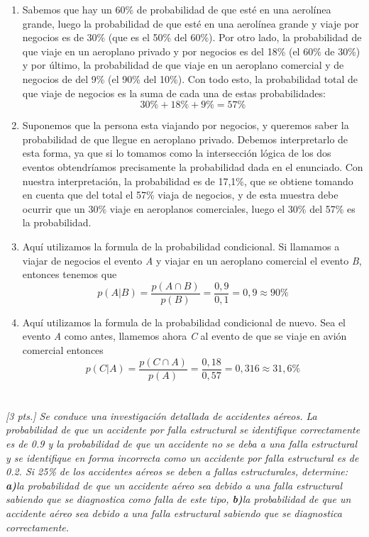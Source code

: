 \documentclass[11pt]{article}
\renewcommand{\(}{\left(}
\renewcommand{\)}{\right)}
\begin{document}
\begin{enumerate}
	\item Sabemos que hay un 60\% de probabilidad de que esté en una aerolínea grande, luego la probabilidad de que esté en una aerolínea grande y viaje por negocios es de 30\% (que es el 50\% del 60\%). Por otro lado, la probabilidad de que viaje en un aeroplano privado y por negocios es del 18\% (el 60\% de 30\%) y por último, la probabilidad de que viaje en un aeroplano comercial y de negocios de del 9\% (el 90\% del 10\%). Con todo esto, la probabilidad total de que viaje de negocios es la suma de cada una de estas probabilidades: $$ 30\%+18\%+9\% = 57\%$$
	\item Suponemos que la persona esta viajando por negocios, y queremos saber la probabilidad de que llegue en aeroplano privado. Debemos interpretarlo de esta forma, ya que si lo tomamos como la intersección lógica de los dos eventos obtendríamos precisamente la probabilidad dada en el enunciado. Con nuestra interpretación, la probabilidad es de 17,1\%, que se obtiene tomando en cuenta que del total el 57\% viaja de negocios, y de esta muestra debe ocurrir que un 30\% viaje en aeroplanos comerciales, luego el 30\% del 57\% es la probabilidad.
	\item Aquí utilizamos la formula de la probabilidad condicional. Si llamamos a viajar de negocios el evento \textit{A} y viajar en un aeroplano comercial el evento \textit{B}, entonces tenemos que 
	$$p(A|B) = \frac{ p(A \cap B)}{p(B)} = \frac{0,9}{0,1} = 0,9 \approx 90\%$$
	\item Aquí utilizamos la formula de la probabilidad condicional de nuevo. Sea el evento \textit{A} como antes, llamemos ahora \textit{C} al evento de que se viaje en avión comercial entonces
	$$p(C|A) = \frac{p(C \cap A)}{p(A)} = \frac{0,18}{0,57} = 0,316 \approx 31,6 \% $$
\end{enumerate}

\section{}

\textit{[3 pts.] Se conduce una investigación detallada de accidentes aéreos. La probabilidad de que un accidente por falla estructural se identifique correctamente es de 0.9 y la probabilidad de que un accidente no se deba a una falla estructural y se identifique en forma incorrecta como un accidente por falla estructural es de 0.2. Si 25\% de los accidentes aéreos se deben a fallas estructurales, determine: \\ \textbf{a)}la probabilidad de que un accidente aéreo sea debido a una falla estructural sabiendo que se diagnostica como falla de este tipo, \textbf{b)}la probabilidad de que un accidente aéreo sea debido a una falla estructural sabiendo que se diagnostica correctamente.} \\
\end{document}
